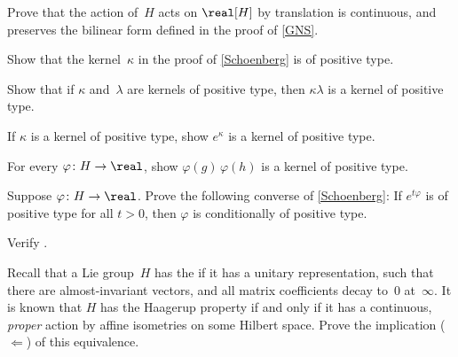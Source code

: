 \begin{exercises}
\item \label{GNSPf-ActCont&IsomEx}
Prove that the action of~$H$ acts on $\real[H]$ by translation is continuous, and preserves the bilinear form defined in the proof of \cref{GNS}. 

\item \label{SchoenbergEx-K} 
Show that the kernel~$\kappa$ in the proof of \cref{Schoenberg} is of positive type.

\item \label{SchoenbergEx-prod} 
Show that if $\kappa$ and~$\lambda$ are kernels of positive type, then $\kappa \lambda$ is a kernel of positive type.

\item \label{SchoenbergEx-exp} 
If $\kappa$ is a kernel of positive type, show $e^\kappa$ is a kernel of positive type.

\item \label{SchoenbergEx-func}
For every $\varphi \colon H \to \real$, show $\varphi(g)\, \varphi(h)$ is a kernel of positive type.

\item Suppose $\varphi \colon H \to \real$.
Prove the following converse of \cref{Schoenberg}:
If $e^{t\varphi}$ is of positive type for all $t > 0$, then $\varphi$ is conditionally of positive type.

\item \label{T<>FH-PhiIsEquiEx}
Verify .

\item \label{Haagerup<>proper}
Recall that a Lie group~$H$ has the  if it has a unitary representation, such that there are almost-invariant vectors, and all matrix coefficients decay to~$0$ at~$\infty$.
It is known that $H$ has the Haagerup property if and only if it has a continuous, \emph{proper} action by affine isometries on some Hilbert space. Prove the implication ($\Leftarrow$) of this equivalence.

\end{exercises}




